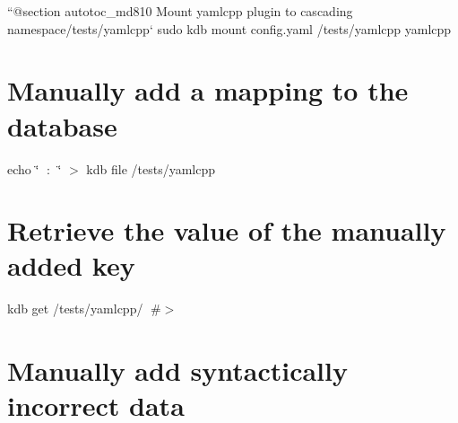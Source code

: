 ``{\ttfamily  @section autotoc\+\_\+md810 Mount yamlcpp plugin to cascading namespace}/tests/yamlcpp` sudo kdb mount config.\+yaml /tests/yamlcpp yamlcpp\hypertarget{autotoc_md807_autotoc_md811}{}\section{Manually add a mapping to the database}\label{autotoc_md807_autotoc_md811}
echo \char`\"{}🔑 \+: 🐳\char`\"{} $>$ {\ttfamily kdb file /tests/yamlcpp} \hypertarget{autotoc_md807_autotoc_md812}{}\section{Retrieve the value of the manually added key}\label{autotoc_md807_autotoc_md812}
kdb get /tests/yamlcpp/🔑 \#$>$ 🐳\hypertarget{autotoc_md807_autotoc_md813}{}\section{Manually add syntactically incorrect data}\label{autotoc_md807_autotoc_md813}
